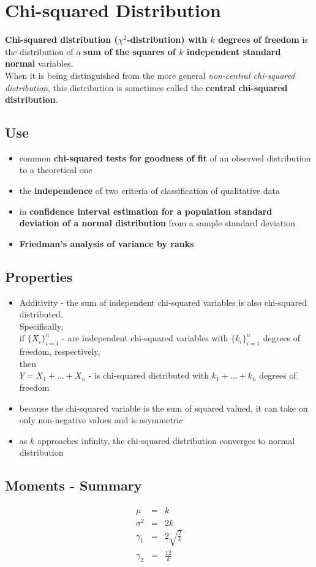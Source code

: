 \chapter{Chi-squared Distribution}
\textbf{\color{ForestGreen}Chi-squared distribution ($\chi^{2}$-distribution) with $k$ degrees of freedom} is the distribution of a \textbf{\color{blue}sum of the squares of $k$ independent standard normal} variables.\\
When it is being distinguished from the more general \textit{\color{blue}non-central chi-squared distribution}, this distribution is sometimes called the \textbf{\color{ForestGreen}central chi-squared distribution}.

\section{Use}
\begin{itemize}
	\item common \textbf{\color{blue}chi-squared tests for goodness of fit} of an observed distribution to a theoretical one
	\item the \textbf{\color{blue}independence} of two criteria of classification of qualitative data
	\item in \textbf{\color{blue}confidence interval estimation for a population standard deviation of a normal distribution} from a sample standard deviation
	\item \textbf{\color{blue}Friedman's analysis of variance by ranks}
\end{itemize}

\section{Properties}
\begin{itemize}
	\item Additivity - the sum of independent chi-squared variables is also chi-squared distributed.\\
	Specifically,\\
	if $\{X_{i}\}_{i = 1}^{n}$ - are independent chi-squared variables with $\{k_{i}\}_{i = 1}^{n}$ degrees of freedom, respectively,\\
	then\\
	$Y = X_{1} + ... + X_{n}$ - is chi-squared distributed with $k_{1} + ... + k_{n}$ degrees of freedom
	\item because the chi-squared variable is the sum of squared valued, it can take on only non-negative values and is asymmetric
	\item as $k$ approaches infinity, the chi-squared distribution converges to normal distribution
\end{itemize}

\section{Moments - Summary}
\begin{eqnarray}
	\mu &=& k\\
	\sigma^{2} &=& 2k\\
	\gamma_{1} &=& 2\sqrt{\frac{2}{k}}\\
	\gamma_{2} &=& \frac{12}{k}
\end{eqnarray}
